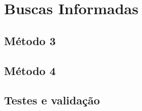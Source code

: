 \section{Buscas Informadas}
\label{sec:busca-informada}

\lipsum[11]

\subsection{Método 3}
\label{subsec:metodo-3}
\lipsum[12]

\subsection{Método 4}
\label{subsec:metodo-4}
\lipsum[13]

\subsection{Testes e validação}
\label{subsec:testes}
\lipsum[14]
